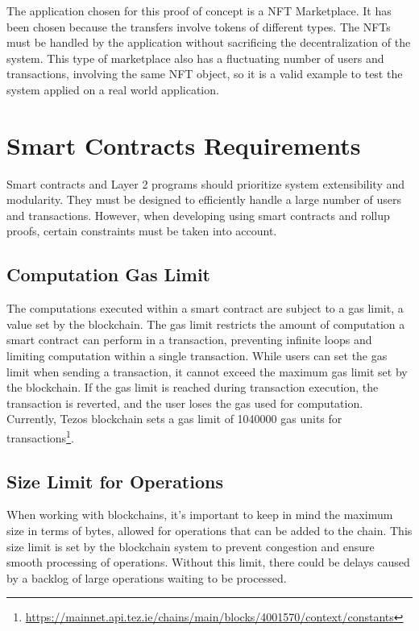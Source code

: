 The application chosen for this proof of concept is a NFT Marketplace. It has been chosen because the transfers involve tokens of different types. The NFTs must be handled by the application without sacrificing the decentralization of the system. This type of marketplace also has a fluctuating number of users and transactions, involving the same NFT object, so it is a valid example to test the system applied on a real world application.

\section{Smart Contracts Requirements \label{sec:3_smartContractsRequirements}}

Smart contracts and Layer 2 programs should prioritize system extensibility and modularity. They must be designed to efficiently handle a large number of users and transactions. However, when developing using smart contracts and rollup proofs, certain constraints must be taken into account.

\subsection{Computation Gas Limit \label{subsec:gasLimit}}

The computations executed within a smart contract are subject to a gas limit, a value set by the blockchain. The gas limit restricts the amount of computation a smart contract can perform in a transaction, preventing infinite loops and limiting computation within a single transaction. While users can set the gas limit when sending a transaction, it cannot exceed the maximum gas limit set by the blockchain. If the gas limit is reached during transaction execution, the transaction is reverted, and the user loses the gas used for computation. Currently, Tezos blockchain sets a gas limit of 1040000 gas units for transactions\footnote{\url{https://mainnet.api.tez.ie/chains/main/blocks/4001570/context/constants}}.

\subsection{Size Limit for Operations}

When working with blockchains, it's important to keep in mind the maximum size in terms of bytes, allowed for operations that can be added to the chain. This size limit is set by the blockchain system to prevent congestion and ensure smooth processing of operations. Without this limit, there could be delays caused by a backlog of large operations waiting to be processed.


